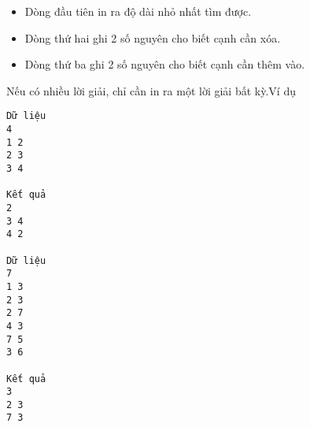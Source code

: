 \begin{itemize}
	\item     Dòng đầu tiên in ra độ dài nhỏ nhất tìm được.   
	\item     Dòng thứ hai ghi 2 số nguyên cho biết cạnh cần xóa.   
	\item     Dòng thứ ba ghi 2 số nguyên cho biết cạnh cần thêm   vào.   
\end{itemize}

   Nếu có nhiều lời giải, chỉ cần in ra một lời giải bất kỳ.Ví dụ  
\begin{verbatim}
Dữ liệu
4
1 2
2 3
3 4

Kết quả
2
3 4
4 2

Dữ liệu
7
1 3
2 3
2 7
4 3
7 5
3 6

Kết quả
3
2 3
7 3
\end{verbatim}